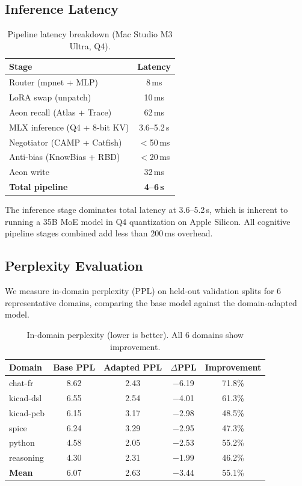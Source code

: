 \documentclass[11pt,a4paper]{article}
\begin{document}
\subsection{Inference Latency}

\begin{table}[h]
\centering
\caption{Pipeline latency breakdown (Mac Studio M3 Ultra, Q4).}
\label{tab:latency}
\begin{tabular}{lc}
\toprule
\textbf{Stage} & \textbf{Latency} \\
\midrule
Router (mpnet + MLP) & 8\,ms \\
LoRA swap (unpatch) & 10\,ms \\
Aeon recall (Atlas + Trace) & 62\,ms \\
MLX inference (Q4 + 8-bit KV) & 3.6--5.2\,s \\
Negotiator (CAMP + Catfish) & $<$50\,ms \\
Anti-bias (KnowBias + RBD) & $<$20\,ms \\
Aeon write & 32\,ms \\
\midrule
\textbf{Total pipeline} & \textbf{4--6\,s} \\
\bottomrule
\end{tabular}
\end{table}

The inference stage dominates total latency at 3.6--5.2\,s, which is inherent to running a 35B MoE model in Q4 quantization on Apple Silicon. All cognitive pipeline stages combined add less than 200\,ms overhead.

\subsection{Perplexity Evaluation}

We measure in-domain perplexity (PPL) on held-out validation splits for 6 representative domains, comparing the base model against the domain-adapted model.

\begin{table}[h]
\centering
\caption{In-domain perplexity (lower is better). All 6 domains show improvement.}
\label{tab:ppl}
\begin{tabular}{lcccc}
\toprule
\textbf{Domain} & \textbf{Base PPL} & \textbf{Adapted PPL} & \textbf{$\Delta$PPL} & \textbf{Improvement} \\
\midrule
chat-fr & 8.62 & 2.43 & $-$6.19 & 71.8\% \\
kicad-dsl & 6.55 & 2.54 & $-$4.01 & 61.3\% \\
kicad-pcb & 6.15 & 3.17 & $-$2.98 & 48.5\% \\
spice & 6.24 & 3.29 & $-$2.95 & 47.3\% \\
python & 4.58 & 2.05 & $-$2.53 & 55.2\% \\
reasoning & 4.30 & 2.31 & $-$1.99 & 46.2\% \\
\midrule
\textbf{Mean} & 6.07 & 2.63 & $-$3.44 & 55.1\% \\
\bottomrule
\end{tabular}
\end{table}
\end{document}
